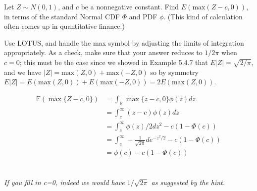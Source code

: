 

\setcounter{theorem}{34}
\begin{exercise}[BH.5.35] Let $Z \sim N(0, 1)$, and $c$ be a nonnegative constant. Find $E(\text{max}(Z - c, 0))$, in terms of the standard Normal CDF $\Phi$ and PDF $\phi$. (This kind of calculation often comes up in quantitative finance.)
\begin{hint}
    Use LOTUS, and handle the max symbol by adjusting the limits of integration appropriately. As a check, make sure that your answer reduces to $1/ 2 \pi$ when $c = 0$; this must be the case since we showed in Example 5.4.7 that $E|Z| = \sqrt{2/\pi}$, and we have $|Z| = \text{max}(Z, 0) + \text{max}(-Z, 0)$ so by symmetry $E|Z| = E(\text{max}(Z, 0)) + E(\text{max}(-Z, 0)) = 2E(\text{max}(Z, 0))$.
\end{hint}
\begin{solution}
    \begin{align*}
    	\mathbb{E}\left(\max\{Z-c,0 \} \right) & = \int_\mathbb{R} \max\{z-c,0 \}\phi(z) dz\\
    	&= \int_c^\infty (z-c)\phi(z) dz \\
    	&= \int_c^\infty \phi(z)/2 dz^2 - c(1-\Phi(c)) \\
    	&= \int_c^\infty -\frac{1}{\sqrt{2\pi}} de^{-z^2/2} - c(1-\Phi(c)) \\
    	&= \phi(c)- c(1-\Phi(c))
    \end{align*}\\~\\
    \textit{If you fill in c=0, indeed we would have $1/\sqrt{2\pi}$ as suggested by the hint.}\\~\\
    

\end{solution}
\end{exercise}
